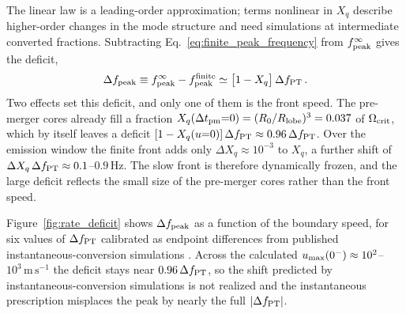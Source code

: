 \documentclass[10pt,superscriptaddress,amsmath,aps,prc,twocolumn,nofootinbib,floatfix]{revtex4-1}
\newcommand{\m}{\text{m}}
\newcommand{\s}{\text{s}}
\begin{document}
The linear law is a leading-order approximation; terms nonlinear in $X_q$ describe higher-order changes in the mode structure and need simulations at intermediate converted fractions.
Subtracting Eq.~\eqref{eq:finite_peak_frequency} from $f_{\rm peak}^{\infty}$ gives the deficit,
\begin{equation}
\Delta f_{\rm peak}
\equiv
f_{\rm peak}^{\infty}-f_{\rm peak}^{\rm finite}
\simeq
\bigl[1-X_q\bigr]\,\Delta f_{\rm PT}\,.
\label{eq:rate_shift}
\end{equation}
Two effects set this deficit, and only one of them is the front speed.
The pre-merger cores already fill a fraction $X_q(\Delta t_{\rm pm}{=}0)=(R_0/R_{\rm lobe})^3=0.037$ of $\Omega_{\rm crit}$, which by itself leaves a deficit $[1-X_q(u{=}0)]\,\Delta f_{\rm PT}\approx0.96\,\Delta f_{\rm PT}$.
Over the emission window the finite front adds only $\Delta X_q\approx10^{-3}$ to $X_q$, a further shift of $\Delta X_q\,\Delta f_{\rm PT}\approx0.1$--$0.9\,$Hz.
The slow front is therefore dynamically frozen, and the large deficit reflects the small size of the pre-merger cores rather than the front speed.

Figure~\ref{fig:rate_deficit} shows $\Delta f_{\rm peak}$ as a function of the boundary speed, for six values of $\Delta f_{\rm PT}$ calibrated as endpoint differences from published instantaneous-conversion simulations \cite{Prakash:2023afe,Bauswein:2018bma}.
Across the calculated $u_{\rm max}(0^-)\approx10^{2}$--$10^{3}\,\m\,\s^{-1}$ the deficit stays near $0.96\,\Delta f_{\rm PT}$, so the shift predicted by instantaneous-conversion simulations is not realized and the instantaneous prescription misplaces the peak by nearly the full $|\Delta f_{\rm PT}|$.
\end{document}
